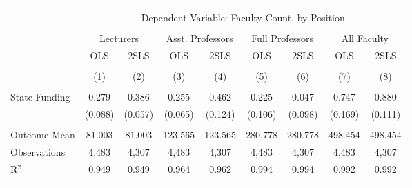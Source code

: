 
\begin{tabular}{@{\extracolsep{5pt}}lcccccccc} 
\\[-1.8ex]\hline 
\hline \\[-1.8ex] 
 & \multicolumn{8}{c}{Dependent Variable: Faculty Count, by Position} \\ 
\cline{2-9} 
\\[-1.8ex] & \multicolumn{2}{c}{Lecturers} & \multicolumn{2}{c}{Asst. Professors} & \multicolumn{2}{c}{Full Professors} & \multicolumn{2}{c}{All Faculty} \\ 
 & OLS & 2SLS & OLS & 2SLS & OLS & 2SLS & OLS & 2SLS \\ 
\\[-1.8ex] & (1) & (2) & (3) & (4) & (5) & (6) & (7) & (8)\\ 
\hline \\[-1.8ex] 
 State Funding & 0.279 & 0.386 & 0.255 & 0.462 & 0.225 & 0.047 & 0.747 & 0.880 \\ 
  & (0.088) & (0.057) & (0.065) & (0.124) & (0.106) & (0.098) & (0.169) & (0.111) \\ 
 \hline \\[-1.8ex] 
Outcome Mean & 81.003 & 81.003 & 123.565 & 123.565 & 280.778 & 280.778 & 498.454 & 498.454 \\ 
Observations & 4,483 & 4,307 & 4,483 & 4,307 & 4,483 & 4,307 & 4,483 & 4,307 \\ 
R$^{2}$ & 0.949 & 0.949 & 0.964 & 0.962 & 0.994 & 0.994 & 0.992 & 0.992 \\ 
\hline 
\hline \\[-1.8ex] 
\end{tabular} 
